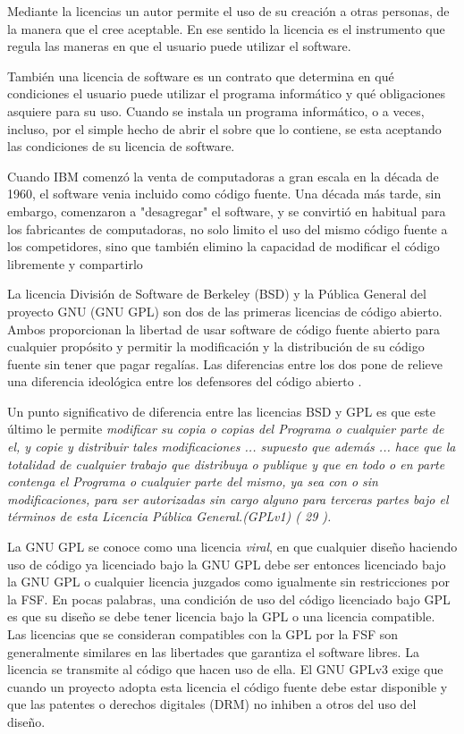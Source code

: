 Mediante la licencias un autor permite el uso de su creación a otras personas, de la manera que el cree aceptable. En ese sentido la licencia es el instrumento que regula las maneras en que el usuario puede utilizar el software.

También una licencia de software es un contrato que determina en qué condiciones el usuario puede utilizar el programa informático y qué obligaciones asquiere para su uso. Cuando se instala un programa informático, o a veces, incluso, por el simple hecho de abrir el sobre que lo contiene, se esta aceptando las condiciones de su licencia de software.

Cuando IBM comenzó la venta de computadoras a gran escala en la década de 1960, el software venia incluido como código fuente. Una década más tarde, sin embargo, comenzaron a "desagregar"  el software, y se convirtió en habitual para los fabricantes de computadoras, no solo limito  el uso del mismo código fuente a los competidores, sino que también elimino la capacidad de modificar el código libremente y compartirlo%
	
La licencia División de Software de Berkeley (BSD) y la Pública General del proyecto GNU (GNU GPL) son dos de las primeras licencias de código abierto. Ambos proporcionan la libertad de usar software de código fuente abierto para cualquier propósito y permitir la modificación y la distribución de su código fuente sin tener que pagar regalías. Las diferencias entre los dos pone de relieve una diferencia ideológica entre los defensores del código abierto .

Un punto significativo de diferencia entre las licencias BSD y GPL es que este último le permite
\textit{modificar su copia o copias del Programa o cualquier parte de el, y copie
y distribuir tales modificaciones ... supuesto que además ... hace que la
totalidad de cualquier trabajo que distribuya o publique y que en todo o en
parte contenga el Programa o cualquier parte del mismo, ya sea con o sin
modificaciones, para ser autorizadas sin cargo alguno para terceras partes bajo el
términos de esta Licencia Pública General.(GPLv1) ( 29 ). } %

La GNU GPL se conoce como una licencia \textit{viral}, en que cualquier diseño haciendo uso de código ya licenciado bajo la GNU GPL debe ser entonces licenciado bajo la
GNU GPL o cualquier licencia juzgados como igualmente sin restricciones por la FSF. En pocas palabras, una condición de uso del código licenciado bajo GPL es que su diseño se debe tener licencia bajo la GPL o una licencia compatible. Las licencias que se consideran compatibles con la GPL por la FSF son generalmente similares en las libertades que garantiza el software libres. La licencia se transmite al código que hacen uso de ella. El GNU GPLv3 exige que cuando un proyecto adopta esta licencia el código fuente debe estar disponible y que las patentes o derechos digitales (DRM) no inhiben a otros del uso del diseño. 

